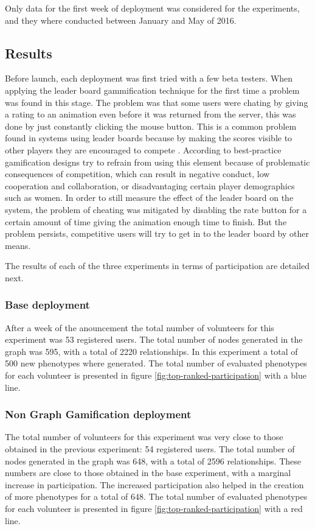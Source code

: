 \documentclass[conference]{IEEEtran}
\begin{document}
Only data for the first week of deployment was considered for the experiments, and they where conducted 
between January and May of 2016. 

\subsection{Results}
\label{sec:results}

Before launch, each deployment was first tried with a few beta testers. When applying the leader board
gammification technique for the first time a problem was found in this stage. The problem was that some 
users were chating by giving a rating to an animation even before it was returned from the server, this was done by just
constantly clicking the mouse button. This is a common problem found in systems using leader boards because
by making the scores visible to other players they are encouraged to compete \cite{hickman2010total}. 
According to \cite{kumar2013gamification} best-practice gamification designs try to
refrain from using this element because of  problematic consequences of competition, which can result 
in negative conduct, low cooperation and collaboration, or disadvantaging certain player
demographics such as women. In order to still measure the effect of the leader board on the system, the 
problem of cheating was mitigated by disabling the rate button for a certain amount of time giving the animation
enough time to finish. But the problem persists, competitive users will try to get in to the leader board by other means.

%
The results of each of the three experiments in terms of participation are detailed next.

\subsubsection{ Base deployment}
After a week of the anouncement the total number of volunteers for this experiment was 53 registered users. 
The total number of nodes generated in the graph was 595, with a total of 2220 relationships. In this
experiment a total of 500 new phenotypes where generated. The total number of evaluated
phenotypes for each volunteer is presented in figure
\ref{fig:top-ranked-participation} with a blue line. %


\subsubsection{ Non Graph Gamification deployment}
The total number of volunteers for this experiment was very close to those obtained in the previous
experiment: 54 registered users. The total number of nodes generated in the graph was 648, 
with a total of 2596 relationships. These numbers are close to those obtained in the base experiment,
with a marginal increase in participation. The increased participation also helped in the creation of
more phenotypes for a total of 648. The total number of evaluated
phenotypes for each volunteer is presented in figure \ref{fig:top-ranked-participation} with a red line. 
\end{document}
